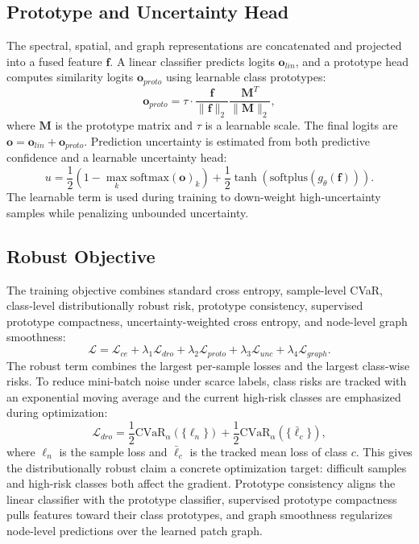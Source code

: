 \subsection{Prototype and Uncertainty Head}
The spectral, spatial, and graph representations are concatenated and projected into a fused feature $\mathbf{f}$. A linear classifier predicts logits $\mathbf{o}_{lin}$, and a prototype head computes similarity logits $\mathbf{o}_{proto}$ using learnable class prototypes:
\begin{equation}
\mathbf{o}_{proto}=\tau \cdot \frac{\mathbf{f}}{\|\mathbf{f}\|_2}\frac{\mathbf{M}^{T}}{\|\mathbf{M}\|_2},
\end{equation}
where $\mathbf{M}$ is the prototype matrix and $\tau$ is a learnable scale. The final logits are $\mathbf{o}=\mathbf{o}_{lin}+\mathbf{o}_{proto}$. Prediction uncertainty is estimated from both predictive confidence and a learnable uncertainty head:
\begin{equation}
u=\frac{1}{2}\left(1-\max_k \mathrm{softmax}(\mathbf{o})_k\right)+\frac{1}{2}\tanh(\mathrm{softplus}(g_{\theta}(\mathbf{f}))).
\end{equation}
The learnable term is used during training to down-weight high-uncertainty samples while penalizing unbounded uncertainty.

\subsection{Robust Objective}
The training objective combines standard cross entropy, sample-level CVaR, class-level distributionally robust risk, prototype consistency, supervised prototype compactness, uncertainty-weighted cross entropy, and node-level graph smoothness:
\begin{equation}
\mathcal{L}=\mathcal{L}_{ce}+\lambda_1\mathcal{L}_{dro}+\lambda_2\mathcal{L}_{proto}+\lambda_3\mathcal{L}_{unc}+\lambda_4\mathcal{L}_{graph}.
\end{equation}
The robust term combines the largest per-sample losses and the largest class-wise risks. To reduce mini-batch noise under scarce labels, class risks are tracked with an exponential moving average and the current high-risk classes are emphasized during optimization:
\begin{equation}
\mathcal{L}_{dro}=\frac{1}{2}\mathrm{CVaR}_{\alpha}(\{\ell_n\})+\frac{1}{2}\mathrm{CVaR}_{\alpha}(\{\bar{\ell}_c\}),
\end{equation}
where $\ell_n$ is the sample loss and $\bar{\ell}_c$ is the tracked mean loss of class $c$. This gives the distributionally robust claim a concrete optimization target: difficult samples and high-risk classes both affect the gradient. Prototype consistency aligns the linear classifier with the prototype classifier, supervised prototype compactness pulls features toward their class prototypes, and graph smoothness regularizes node-level predictions over the learned patch graph.
